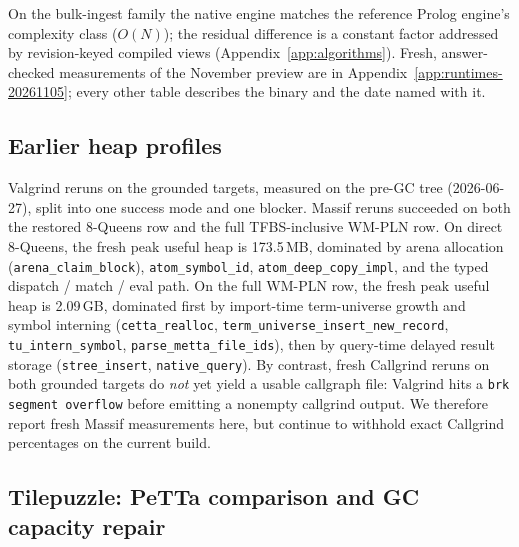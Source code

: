 \documentclass[11pt]{article}
\newcommand{\code}[1]{\texttt{#1}}
\begin{document}
On the bulk-ingest family the native engine matches the reference
Prolog engine's complexity class ($O(N)$); the residual difference is a
constant factor addressed by revision-keyed compiled views
(Appendix~\ref{app:algorithms}).  Fresh, answer-checked measurements of
the November preview are in Appendix~\ref{app:runtimes-20261105}; every
other table describes the binary and the date named with it.

\subsection{Earlier heap profiles}

Valgrind reruns on the grounded targets, measured on the pre-GC tree
(2026-06-27), split into one success
mode and one blocker.  Massif reruns succeeded on both the restored
8-Queens row and the full TFBS-inclusive WM-PLN row.  On direct
8-Queens, the fresh peak useful heap is 173.5\,MB, dominated by arena
allocation (\code{arena\_claim\_block}), \code{atom\_symbol\_id},
\code{atom\_deep\_copy\_impl}, and the typed dispatch / match / eval
path.  On the full WM-PLN row, the fresh peak useful heap is
2.09\,GB, dominated first by import-time term-universe growth and
symbol interning
(\code{cetta\_realloc}, \code{term\_universe\_insert\_new\_record},
\code{tu\_intern\_symbol}, \code{parse\_metta\_file\_ids}), then by
query-time delayed result storage
(\code{stree\_insert}, \code{native\_query}).  By contrast, fresh
Callgrind reruns on both grounded targets do \emph{not} yet yield a
usable callgraph file: Valgrind hits a \code{brk segment overflow}
before emitting a nonempty callgrind output.  We therefore report fresh
Massif measurements here, but continue to withhold exact Callgrind
percentages on the current build.

\subsection{Tilepuzzle: PeTTa comparison and GC capacity repair}
\label{sec:tilepuzzle-gc}
\end{document}
